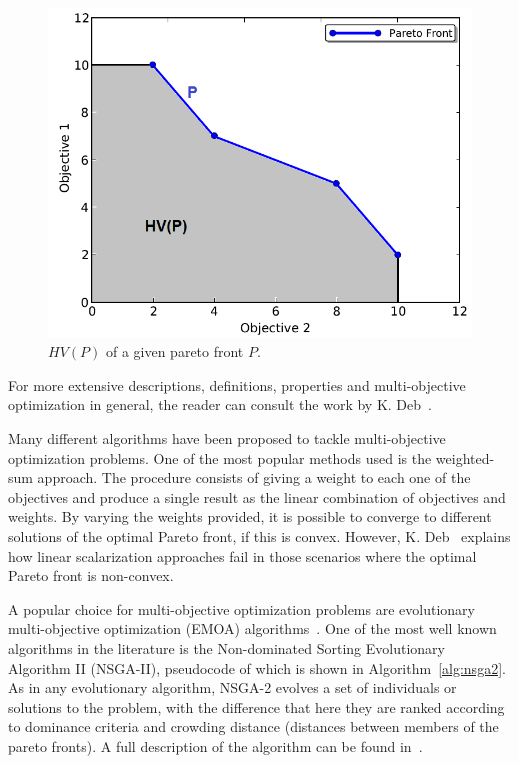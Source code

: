 \documentclass[journal]{IEEEtran}
\begin{document}
\begin{figure}[!t]
\begin{center}
\includegraphics[width=0.75\columnwidth]{img/hv}
\end{center}
\caption{$HV(P)$ of a given pareto front $P$.}
\label{fig:hv}
\end{figure}

For more extensive descriptions, definitions, properties and multi-objective optimization in general, the reader can consult the work by K. Deb~\cite{Deb2001}.

Many different algorithms have been proposed to tackle multi-objective optimization problems. One of the most popular methods used is the weighted-sum approach. The procedure consists of giving a weight to each one of the objectives and produce a single result as the linear combination of objectives and weights. By varying the weights provided, it is possible to converge to different solutions of the optimal Pareto front, if this is convex. However, K. Deb~\cite{Deb2001} explains how linear scalarization approaches fail in those scenarios where the optimal Pareto front is non-convex.

A popular choice for multi-objective optimization problems are evolutionary multi-objective optimization (EMOA) algorithms~\cite{Coello1999, Zhou2011}. One of the most well known algorithms in the literature is the Non-dominated Sorting Evolutionary Algorithm II (NSGA-II), pseudocode of which is shown in Algorithm~\ref{alg:nsga2}. As in any evolutionary algorithm, NSGA-2 evolves a set of individuals or solutions to the problem, with the difference that here they are ranked according to dominance criteria and crowding distance (distances between members of the pareto fronts). A full description of the algorithm can be found in~\cite{Deb2000}.
\end{document}
